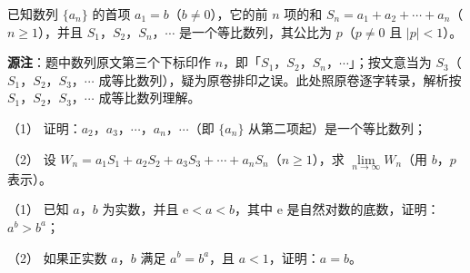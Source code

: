 \begin{question}
已知数列 $\{a_n\}$ 的首项 $a_1=b$（$b\neq0$），它的前 $n$ 项的和 $S_n=a_1+a_2+\cdots+a_n$（$n\geqslant1$），并且 $S_1$，$S_2$，$S_n$，$\cdots$ 是一个等比数列，其公比为 $p$（$p\neq0$ 且 $\lvert p\rvert<1$）。

\begin{gktip}
\textbf{源注}：题中数列原文第三个下标印作 $n$，即「$S_1$，$S_2$，$S_n$，$\cdots$」；按文意当为 $S_3$（$S_1$，$S_2$，$S_3$，$\cdots$ 成等比数列），疑为原卷排印之误。此处照原卷逐字转录，解析按 $S_1$，$S_2$，$S_3$，$\cdots$ 成等比数列理解。
\end{gktip}

（1） 证明：$a_2$，$a_3$，$\cdots$，$a_n$，$\cdots$（即 $\{a_n\}$ 从第二项起）是一个等比数列；

（2） 设 $W_n=a_1S_1+a_2S_2+a_3S_3+\cdots+a_nS_n$（$n\geqslant1$），求 $\lim\limits_{n\to\infty}W_n$（用 $b$，$p$ 表示）。

\end{question}
\begin{question}
（1） 已知 $a$，$b$ 为实数，并且 $\mathrm e<a<b$，其中 $\mathrm e$ 是自然对数的底数，证明：$a^b>b^a$；

（2） 如果正实数 $a$，$b$ 满足 $a^b=b^a$，且 $a<1$，证明：$a=b$。

\end{question}